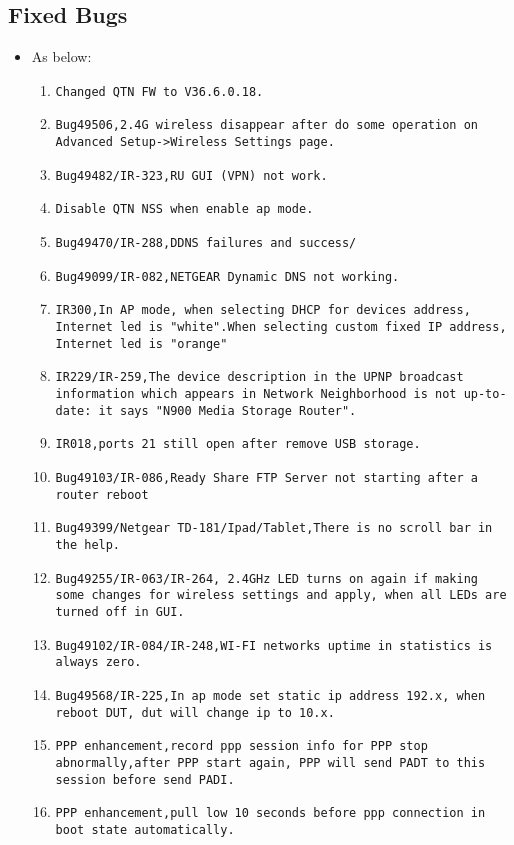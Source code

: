 \documentclass[12pt]{report}
\begin{document}
    \subsection{Fixed Bugs}
    \begin{itemize}
    \item As below:
    	\begin{enumerate}
		\item \texttt{Changed QTN FW to V36.6.0.18.}
		\item \texttt{Bug49506,2.4G wireless disappear after do some operation on Advanced Setup->Wireless Settings page.}
		\item \texttt{Bug49482/IR-323,RU GUI (VPN) not work.}
		\item \texttt{Disable QTN NSS when enable ap mode.}
		\item \texttt{Bug49470/IR-288,DDNS failures and success/}
		\item \texttt{Bug49099/IR-082,NETGEAR Dynamic DNS not working.}
		\item \texttt{IR300,In AP mode, when selecting DHCP for devices address, Internet led is "white".When selecting custom fixed IP address, Internet led is "orange"}
		\item \texttt{IR229/IR-259,The device description in the UPNP broadcast information which appears in Network Neighborhood is not up-to-date: it says "N900 Media Storage Router".}
		\item \texttt{IR018,ports 21 still open after remove USB storage.}
		\item \texttt{Bug49103/IR-086,Ready Share FTP Server not starting after a router reboot}
		\item \texttt{Bug49399/Netgear TD-181/Ipad/Tablet,There is no scroll bar in the help.}
		\item \texttt{Bug49255/IR-063/IR-264, 2.4GHz LED turns on again if making some changes for wireless settings and apply, when all LEDs are turned off in GUI.}
		\item \texttt{Bug49102/IR-084/IR-248,WI-FI networks uptime in statistics is always zero.}
		\item \texttt{Bug49568/IR-225,In ap mode set static ip address 192.x, when reboot DUT, dut will change ip to 10.x.}
		\item \texttt{PPP enhancement,record ppp session info for PPP stop abnormally,after PPP start again, PPP will send PADT to this session before send PADI.}
		\item \texttt{PPP enhancement,pull low 10 seconds before ppp connection in boot state automatically.}

    	\end{enumerate}
    \end{itemize}
\end{document}
